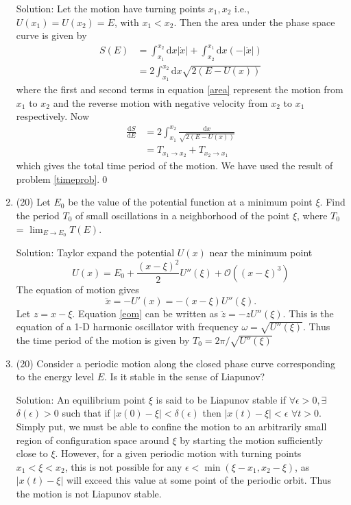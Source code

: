 \begin{enumerate}
Solution: Let the motion have turning points $x_1, x_2$ i.e., $U(x_1) = U(x_2) = E$, with $x_1<x_2$. Then the area under the phase space curve is given by \begin{align}\label{area}
	S(E) &= \int_{x_1}^{x_2}\mathrm{d}x|\dot{x}|+\int_{x_2}^{x_1}\mathrm{d}x(-|\dot{x}|)\\
	& = 2\int_{x_1}^{x_2}\mathrm{d}x \sqrt{2(E-U(x))}
\end{align}
where the first and second terms in equation \eqref{area} represent the motion from $x_1$ to $x_2$ and the reverse motion with negative velocity from $x_2$ to $x_1$ respectively. Now
\begin{align}
	\frac{\mathrm{d}S}{\mathrm{d}E} &= 2\int_{x_1}^{x_2}\frac{\mathrm{d}x}{\sqrt{2(E-U(x))}}\\
	&= T_{x_1\rightarrow x_2} + T_{x_2 \rightarrow x_1}
\end{align}
which gives the total time period of the motion. We have used the result of problem \ref{timeprob}.\qed
\item (20) Let $E_0$ be the value of the potential function at a minimum point $\xi$. Find the period $T_0$ of small oscillations in a neighborhood of the point $\xi$, where $T_0$ = $\lim_{E\rightarrow E_0} T(E)$.\par
Solution: Taylor expand the potential $U(x)$ near the minimum point
\begin{equation}\label{key}
	U(x) = E_0 + \frac{(x-\xi)^2}{2} U''(\xi) + \mathcal{O}((x-\xi)^3)
\end{equation}
The equation of motion gives
\begin{equation}\label{eom}
	\ddot{x} = -U'(x) = -(x-\xi)U''(\xi).
\end{equation}
Let $z = x-\xi$. Equation \eqref{eom} can be written as $\ddot{z} = -z U''(\xi)$. This is the equation of a 1-D harmonic oscillator with frequency $\omega = \sqrt{U''(\xi)}$. Thus the time period of the motion is given by $T_0 = 2\pi/\sqrt{U''(\xi)}$
\item (20) Consider a periodic motion along the closed phase curve corresponding to the energy level $E$. Is it stable in the sense of Liapunov?\par
Solution: An equilibrium point $\xi$ is said to be Liapunov stable if $\forall \epsilon>0, \exists$ $\delta(\epsilon)>0$ such that if $|x(0)-\xi|<\delta(\epsilon)$ then $|x(t)-\xi|<\epsilon$ $\forall t>0$. Simply put, we must be able to confine the motion to an arbitrarily small region of configuration space around $\xi$ by starting the motion sufficiently close to $\xi$. However, for a given periodic motion with turning points $x_1<\xi<x_2$, this is not possible for any $\epsilon<\min(\xi-x_1, x_2-\xi)$, as $|x(t)-\xi|$ will exceed this value at some point of the periodic orbit. Thus the motion is not Liapunov stable.

\end{enumerate}
